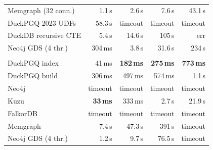 \begin{table}[t]
\begin{tabular}{lrrrr}
\quad Memgraph (32 conn.) & 1.1\,s & 2.6\,s & 7.6\,s & 43.1\,s \\
\quad DuckPGQ 2023 UDFs & 58.3\,s & timeout & timeout & timeout \\
\quad DuckDB recursive CTE & 5.4\,s & 14.6\,s & 105\,s & err \\
\quad Neo4j GDS (4 thr.) & 304\,ms & 3.8\,s & 31.6\,s & 234\,s \\
\addlinespace
\multicolumn{5}{l}{\textit{LDBC SF300}} \\
\quad DuckPGQ index & 41\,ms & \textbf{182\,ms} & \textbf{275\,ms} & \textbf{773\,ms} \\
\quad DuckPGQ build & 306\,ms & 497\,ms & 574\,ms & 1.1\,s \\
\quad Neo4j & timeout & timeout & timeout & timeout \\
\quad Kuzu & \textbf{33\,ms} & 333\,ms & 2.7\,s & 21.9\,s \\
\quad FalkorDB & timeout & timeout & timeout & timeout \\
\quad Memgraph & 7.4\,s & 47.3\,s & 391\,s & timeout \\
\quad Neo4j GDS (4 thr.) & 1.2\,s & 9.7\,s & 76.5\,s & timeout \\
\bottomrule\end{tabular}\end{table}
